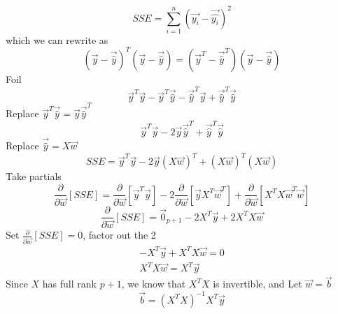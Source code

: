 \documentclass[12pt]{article}
\begin{document}
\begin{enumerate}
\begin{equation*}
SSE=\sum\limits_{i=1}^n(\vec{y_i}-\vec{\hat{y_i}})^2
 \end{equation*}
 which we can rewrite as \begin{equation*}
 (\vec{y}-\vec{\hat{y}})^T(\vec{y}-\vec{\hat{y}})=(\vec{y}^T-\vec{\hat{y}}^T)(\vec{y}-\vec{\hat{y}})
 \end{equation*}
 Foil
 \begin{equation*}
 \vec{y}^T\vec{y}-\vec{y}^T\vec{\hat{y}}-\vec{\hat{y}}^T\vec{y}+\vec{\hat{y}}^T\vec{\hat{y}}
\end{equation*}
Replace $\vec{y}^T\vec{\hat{y}}=\vec{y}\vec{\hat{y}}^T$
\begin{equation*}
\vec{y}^T\vec{y}-2\vec{y}\vec{\hat{y}}^T+\vec{\hat{y}}^T\vec{\hat{y}}
\end{equation*}
Replace $\vec{\hat{y}}=X\vec{w}$
\begin{equation*}
SSE=\vec{y}^T\vec{y}-2\vec{y}(X\vec{w})^T+(X\vec{w})^T(X\vec{w})
\end{equation*}
Take partials
\begin{equation*}
\frac{\partial}{\partial\vec{w}}[SSE]=\frac{\partial}{\partial\vec{w}}[\vec{y}^T\vec{y}]-2\frac{\partial}{\partial\vec{w}}[\vec{y}X^T\vec{w}^T]+\frac{\partial}{\partial\vec{w}}[X^TX\vec{w}^T\vec{w}]
\end{equation*}
\begin{equation*}
\frac{\partial}{\partial\vec{w}}[SSE]= \vec{0}_{p+1}-2X^T\vec{y}+2X^TX\vec{w}
\end{equation*}
Set $\frac{\partial}{\partial\vec{w}}[SSE]=0$, factor out the 2
\begin{align*}
-X^T\vec{y}+X^TX\vec{w}=0 \\
X^TX\vec{w}=X^T\vec{y}
\end{align*}
Since $X$ has full rank $p+1$, we know that $X^TX$ is invertible, and Let $\vec{w}=\vec{b}$
\begin{equation*}
\vec{b}=(X^TX)^{-1}X^T\vec{y}
\end{equation*}


 


\end{enumerate}
\end{document}
